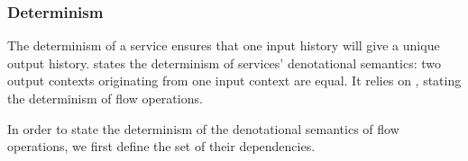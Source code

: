 \subsubsection{Determinism}
\label{sec:semantics:grfrp:theorems:determinism}

The determinism of a service ensures that one input history will give a unique output history.
 states the determinism of services' denotational
semantics: two output contexts originating from one input context are equal.
It relies on , stating the determinism of flow operations.

\newcommand{\depSet}[1]{{\ensuremath{\textit{deps}\left(#1\right)}}}
\begin{definition}
    \label{def:semantics:grfrp:theorems:determinism:deps}

    In order to state the determinism of the denotational semantics of \GRFRP flow operations, we
    first define the set of their dependencies.


\end{definition}
